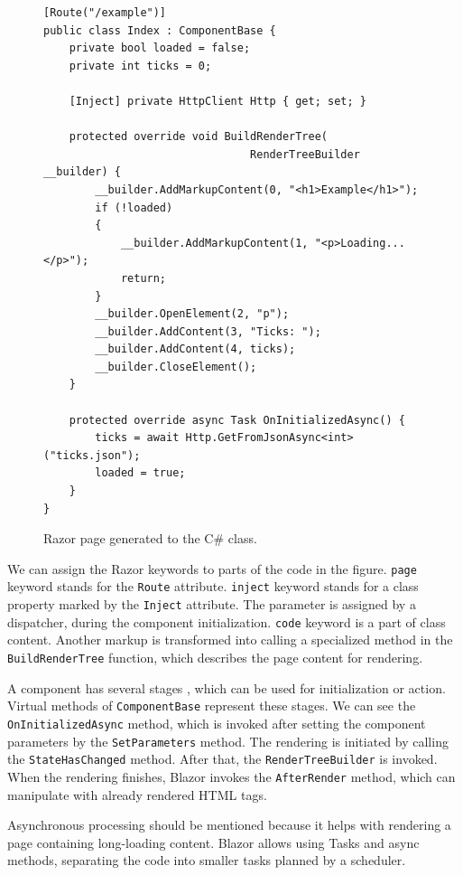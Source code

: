 \begin{figure}
\begin{lstlisting}
[Route("/example")]
public class Index : ComponentBase {
    private bool loaded = false;
    private int ticks = 0;
	
    [Inject] private HttpClient Http { get; set; }

    protected override void BuildRenderTree(
    							RenderTreeBuilder __builder) {
        __builder.AddMarkupContent(0, "<h1>Example</h1>");
        if (!loaded)
        {
            __builder.AddMarkupContent(1, "<p>Loading...</p>");
            return;
        }
        __builder.OpenElement(2, "p");
        __builder.AddContent(3, "Ticks: ");
        __builder.AddContent(4, ticks);
        __builder.CloseElement();
    }

    protected override async Task OnInitializedAsync() {
        ticks = await Http.GetFromJsonAsync<int>("ticks.json");
        loaded = true;
    }
}
\end{lstlisting}
\caption{Razor page generated to the C\# class.}
\label{img06:component}
\end{figure}
\par
We can assign the Razor keywords to parts of the code in the figure.
\texttt{page} keyword stands for the \texttt{Route} attribute.
\texttt{inject} keyword stands for a class property marked by the \texttt{Inject} attribute. 
The parameter is assigned by a dispatcher, during the component initialization.
\texttt{code} keyword is a part of class content.
Another markup is transformed into calling a specialized method in the \texttt{BuildRenderTree} function, which describes the page content for rendering.
\par
A component has several stages \cite{online:lifecycle}, which can be used for initialization or action.
Virtual methods of \texttt{ComponentBase} represent these stages.
We can see the \texttt{OnInitializedAsync} method, which is invoked after setting the component parameters by the \texttt{SetParameters} method.
The rendering is initiated by calling the \texttt{StateHasChanged} method.
After that, the \texttt{RenderTreeBuilder} is invoked.
When the rendering finishes, Blazor invokes the \texttt{AfterRender} method, which can manipulate with already rendered HTML tags.
\par
Asynchronous processing should be mentioned because it helps with rendering a page containing long-loading content.
Blazor allows using Tasks and async methods, separating the code into smaller tasks planned by a scheduler.

